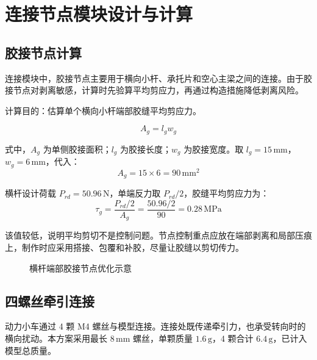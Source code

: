 \documentclass[UTF8,a4paper,12pt,fontset=none]{ctexart}
\numberwithin{equation}{section}
\numberwithin{figure}{section}
\numberwithin{table}{section}
\newcommand{\mm}{\,\mathrm{mm}}
\newcommand{\g}{\,\mathrm{g}}
\newcommand{\Nunit}{\,\mathrm{N}}
\newcommand{\MPa}{\,\mathrm{MPa}}
\begin{document}
\newpage
\section{连接节点模块设计与计算}

\subsection{胶接节点计算}
连接模块中，胶接节点主要用于横向小杆、承托片和空心主梁之间的连接。由于胶接节点对剥离敏感，计算时先验算平均剪应力，再通过构造措施降低剥离风险。

计算目的：估算单个横向小杆端部胶缝平均剪应力。

\begin{equation}
  A_g=l_gw_g
\end{equation}

式中，$A_g$ 为单侧胶接面积；$l_g$ 为胶接长度；$w_g$ 为胶接宽度。取 $l_g=15\mm$，$w_g=6\mm$，代入：
\begin{equation}
  A_g=15\times6=90\mm^2
\end{equation}

横杆设计荷载 $P_{rd}=50.96\Nunit$，单端反力取 $P_{rd}/2$，胶缝平均剪应力为：
\begin{equation}
  \tau_g=\frac{P_{rd}/2}{A_g}=\frac{50.96/2}{90}=0.28\MPa
\end{equation}

该值较低，说明平均剪切不是控制问题。节点控制重点应放在端部剥离和局部压痕上，制作时应采用搭接、包覆和补胶，尽量让胶缝以剪切传力。

\begin{figure}[H]
\centering
{}
\caption{横杆端部胶接节点优化示意}
\label{fig:joint-peel}
\end{figure}

\subsection{四螺丝牵引连接}
动力小车通过 4 颗 M4 螺丝与模型连接。连接处既传递牵引力，也承受转向时的横向扰动。本方案采用最长 $8\mm$ 螺丝，单颗质量 $1.6\g$，4 颗合计 $6.4\g$，已计入模型总质量。
\end{document}
